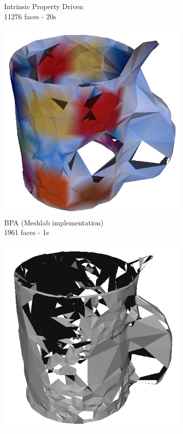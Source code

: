 \documentclass[a4paper,10pt]{report}
\begin{document}
\begin{figure}[h!]
\begin{subfigure}[b]{0.3\textwidth}
        \caption{Intrinsic Property Driven\\11276 faces - 20s}
    \end{subfigure}
    \begin{subfigure}[b]{0.3\textwidth}
	    \includegraphics[width=\textwidth]{results/defaults-bpameshlab.png}
        \caption{BPA (Meshlab implementation)\\1961 faces - 1s}
    \end{subfigure}
    \begin{subfigure}[b]{0.3\textwidth}
	    \includegraphics[width=\textwidth]{results/defaults-bpa.png}

\end{subfigure}
\end{figure}
\end{document}
